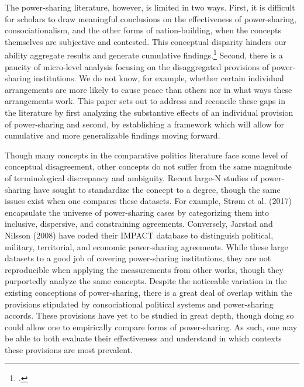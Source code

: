 \documentclass[12pt]{article}
\begin{document}
The power-sharing literature, however, is limited in two ways. First, it is difficult for scholars to draw meaningful conclusions on the effectiveness of power-sharing, consociationalism, and the other forms of nation-building, when the concepts themselves are subjective and contested. This conceptual disparity hinders our ability aggregate results and generate cumulative findings.\footcite{dunning_information_2020} Second, there is a paucity of micro-level analysis focusing on the disaggregated provisions of power-sharing institutions. We do not know, for example, whether certain individual arrangements are more likely to cause peace than others nor in what ways these arrangements work. This paper sets out to address and reconcile these gaps in the literature by first analyzing the substantive effects of an individual provision of power-sharing and second, by establishing a framework which will allow for cumulative and more generalizable findings moving forward. 

Though many concepts in the comparative politics literature face some level of conceptual disagreement, other concepts do not suffer from the same magnitude of terminological discrepancy and ambiguity. Recent large-N studies of power-sharing have sought to standardize the concept to a degree, though the same issues exist when one compares these datasets. For example, Strøm et al. (2017) encapsulate the universe of power-sharing cases by categorizing them into inclusive, dispersive, and constraining agreements. Conversely, Jarstad and Nilsson (2008) have coded their IMPACT database to distinguish political, military, territorial, and economic power-sharing agreements. While these large datasets to a good job of covering power-sharing institutions, they are not reproducible when applying the measurements from other works, though they purportedly analyze the same concepts. Despite the noticeable variation in the existing conceptions of power-sharing, there is a great deal of overlap within the provisions stipulated by consociational political systems and power-sharing accords. These provisions have yet to be studied in great depth, though doing so could allow one to empirically compare forms of power-sharing. As such, one may be able to both evaluate their effectiveness and understand in which contexts these provisions are most prevalent. 
\end{document}
